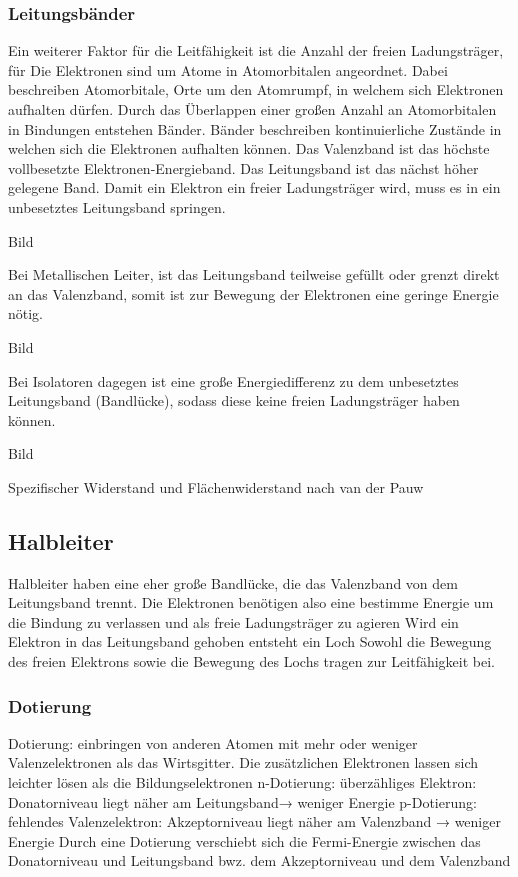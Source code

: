 \documentclass[a4paper]{scrartcl}
\numberwithin{equation}{subsection}
\begin{document}
\subsubsection{Leitungsbänder}
Ein weiterer Faktor für die Leitfähigkeit ist die Anzahl der freien Ladungsträger, für 
Die Elektronen sind um Atome in Atomorbitalen angeordnet. Dabei beschreiben Atomorbitale, Orte um den Atomrumpf, in welchem sich Elektronen aufhalten dürfen. Durch das Überlappen einer großen Anzahl an Atomorbitalen in Bindungen entstehen Bänder.
Bänder beschreiben kontinuierliche Zustände in welchen sich die Elektronen aufhalten können.
Das Valenzband ist das höchste vollbesetzte Elektronen-Energieband. Das Leitungsband ist das nächst höher gelegene Band.
Damit ein Elektron ein freier Ladungsträger wird, muss es in ein unbesetztes Leitungsband springen. 

Bild

Bei Metallischen Leiter, ist das Leitungsband teilweise gefüllt oder grenzt direkt an das Valenzband, somit ist zur Bewegung der Elektronen eine geringe Energie nötig.

Bild

Bei Isolatoren dagegen ist eine große Energiedifferenz zu dem unbesetztes Leitungsband (Bandlücke), sodass diese keine freien Ladungsträger haben können.

Bild

Spezifischer Widerstand und Flächenwiderstand nach van der Pauw

\subsection{Halbleiter}
Halbleiter haben eine eher große Bandlücke, die das Valenzband von dem Leitungsband trennt.
Die Elektronen benötigen also eine bestimme Energie um die Bindung zu verlassen und als freie Ladungsträger zu agieren
Wird ein Elektron in das Leitungsband gehoben entsteht ein Loch
Sowohl die Bewegung des freien Elektrons sowie die Bewegung des Lochs tragen zur Leitfähigkeit bei.

\subsubsection{Dotierung}
Dotierung: einbringen von anderen Atomen mit mehr oder weniger Valenzelektronen als das Wirtsgitter.
Die zusätzlichen Elektronen lassen sich leichter lösen als die Bildungselektronen
n-Dotierung: überzähliges Elektron: Donatorniveau liegt näher am Leitungsband→ weniger Energie
p-Dotierung: fehlendes Valenzelektron: Akzeptorniveau liegt näher am Valenzband → weniger Energie
Durch eine Dotierung verschiebt sich die Fermi-Energie zwischen das Donatorniveau und Leitungsband bwz. dem Akzeptorniveau und dem Valenzband
\end{document}
